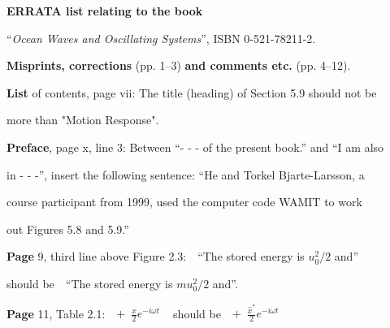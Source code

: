 \documentclass[a4paper,12pt]{article}
\begin{document}
\baselineskip=24pt

\vspace{-1cm}


\centerline{{\bf ERRATA list relating to the book}}

\vspace{-0.2cm}
\centerline{``{\it Ocean Waves and Oscillating Systems}'', ISBN 0-521-78211-2.}
%
%
%
\vspace{-2cm}

\noindent
\vspace{0.9cm}
 
\setlength{\baselineskip}{12pt}

\vspace{0.4cm}

\noindent
{\bf Misprints, corrections} (pp. 1--3) {\bf and comments etc.} (pp. 4--12).

\vspace{0.5 cm}

\noindent

\noindent %
{\bf List} of contents, page vii:  The title (heading) of Section 5.9 should not be 

more than "Motion Response". %
\vspace{0.2cm}

\noindent %
{\bf Preface}, page x, line 3:  Between ``- - - of the present book.'' and ``I am also 

in - - -'', insert the following sentence: ``He and Torkel Bjarte-Larsson, a 

course participant from 1999, used the computer code WAMIT to work 

out Figures 5.8 and 5.9.'' %

\vspace{0.2cm}

\noindent %
{\bf Page} 9, third line above Figure 2.3: \,\,  ``The stored energy is $u_0^2/2$ and''\,\,\, 

should be \,\, ``The stored energy is $mu_0^2/2$ and''. %
\vspace{0.2cm}

\noindent %
{\bf Page} 11, Table 2.1: \,\,  $+ \,\,\, \frac{\hat{x}}{2}e^{-i\omega t}$ \,\,\, should be \,\,  
$+ \,\,\, \frac{\hat{x}^*}{2}e^{-i\omega t}$ %
\vspace{0.2cm}
\end{document}
